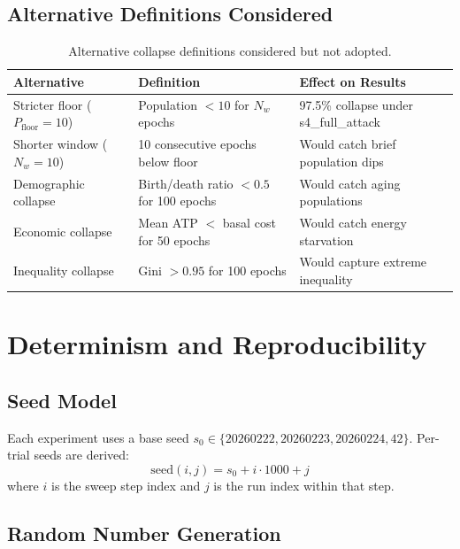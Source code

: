 \documentclass[11pt,a4paper]{article}
\begin{document}
\subsection{Alternative Definitions Considered}

\begin{table}[H]
\centering
\caption{Alternative collapse definitions considered but not adopted.}
\small
\begin{tabular}{@{}lp{4cm}p{5.5cm}@{}}
\toprule
Alternative & Definition & Effect on Results \\
\midrule
Stricter floor ($P_{\text{floor}} = 10$) & Population $< 10$ for $N_w$ epochs & 97.5\% collapse under s4\_full\_attack \\
Shorter window ($N_w = 10$) & 10 consecutive epochs below floor & Would catch brief population dips \\
Demographic collapse & Birth/death ratio $< 0.5$ for 100 epochs & Would catch aging populations \\
Economic collapse & Mean ATP $<$ basal cost for 50 epochs & Would catch energy starvation \\
Inequality collapse & Gini $> 0.95$ for 100 epochs & Would capture extreme inequality \\
\bottomrule
\end{tabular}
\end{table}

\section{Determinism and Reproducibility}

\subsection{Seed Model}

Each experiment uses a base seed $s_0 \in \{20260222, 20260223, 20260224, 42\}$. Per-trial seeds are derived:
\begin{equation}
  \text{seed}(i, j) = s_0 + i \cdot 1000 + j
\end{equation}
where $i$ is the sweep step index and $j$ is the run index within that step.

\subsection{Random Number Generation}
\end{document}
